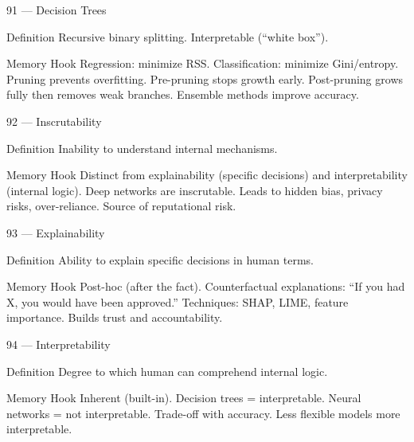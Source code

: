 \documentclass[aspectratio=169,8pt]{beamer}
\begin{document}
	\begin{frame}{91 --- Decision Trees}
		\begin{block}{Definition}
			Recursive binary splitting. Interpretable (``white box'').
		\end{block}
		\begin{block}{Memory Hook}
			Regression: minimize RSS. Classification: minimize Gini/entropy. Pruning prevents overfitting. Pre-pruning stops growth early. Post-pruning grows fully then removes weak branches. Ensemble methods improve accuracy.
		\end{block}
	\end{frame}
	
	\begin{frame}{92 --- Inscrutability}
		\begin{block}{Definition}
			Inability to understand internal mechanisms.
		\end{block}
		\begin{block}{Memory Hook}
			Distinct from explainability (specific decisions) and interpretability (internal logic). Deep networks are inscrutable. Leads to hidden bias, privacy risks, over-reliance. Source of reputational risk.
		\end{block}
	\end{frame}
	
	\begin{frame}{93 --- Explainability}
		\begin{block}{Definition}
			Ability to explain specific decisions in human terms.
		\end{block}
		\begin{block}{Memory Hook}
			Post-hoc (after the fact). Counterfactual explanations: ``If you had X, you would have been approved.'' Techniques: SHAP, LIME, feature importance. Builds trust and accountability.
		\end{block}
	\end{frame}
	
	\begin{frame}{94 --- Interpretability}
		\begin{block}{Definition}
			Degree to which human can comprehend internal logic.
		\end{block}
		\begin{block}{Memory Hook}
			Inherent (built-in). Decision trees = interpretable. Neural networks = not interpretable. Trade-off with accuracy. Less flexible models more interpretable.
		\end{block}
	\end{frame}
	
\end{document}
